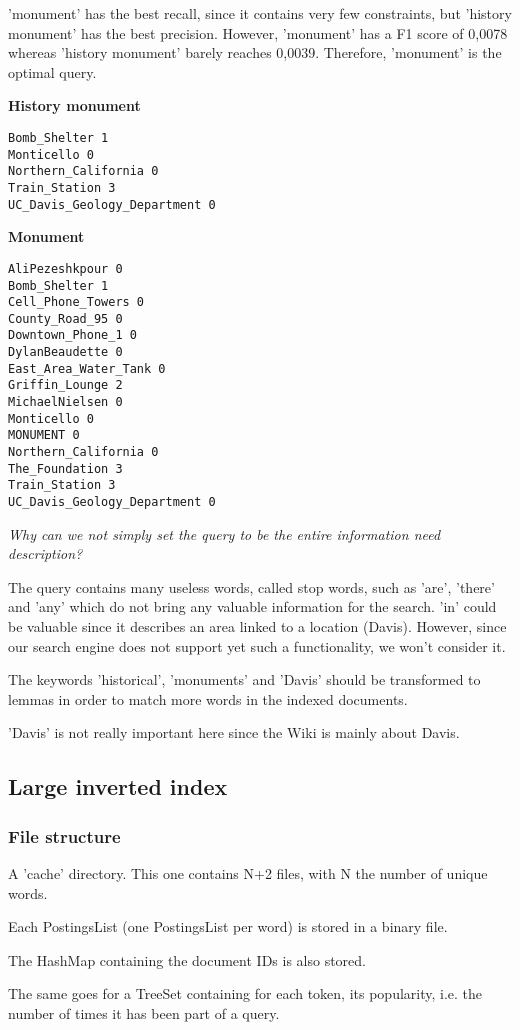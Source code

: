 'monument' has the best recall, since it contains very few constraints, but 'history monument' has the best precision.
However, 'monument' has a F1 score of 0,0078 whereas 'history monument' barely reaches 0,0039. Therefore, 'monument' is the optimal query.

\textbf{History monument}
\begin{verbatim}
Bomb_Shelter 1
Monticello 0
Northern_California 0
Train_Station 3
UC_Davis_Geology_Department 0
\end{verbatim}


\textbf{Monument}
\begin{verbatim}
AliPezeshkpour 0
Bomb_Shelter 1
Cell_Phone_Towers 0
County_Road_95 0
Downtown_Phone_1 0
DylanBeaudette 0
East_Area_Water_Tank 0
Griffin_Lounge 2
MichaelNielsen 0
Monticello 0
MONUMENT 0
Northern_California 0
The_Foundation 3
Train_Station 3
UC_Davis_Geology_Department 0
\end{verbatim}


\textit{Why can we not simply set the query to be the entire information need description?}

The query contains many useless words, called stop words, such as 'are', 'there' and 'any' which do not bring any valuable information for the search.
'in' could be valuable since it describes an area linked to a location (Davis). However, since our search engine does not support yet such a functionality, we won't consider it.

The keywords 'historical', 'monuments' and 'Davis' should be transformed to lemmas in order to match more words in the indexed documents.

'Davis' is not really important here since the Wiki is mainly about Davis.


\subsection{Large inverted index}
\subsubsection{File structure}
A 'cache' directory. This one contains N+2 files, with N the number of unique words.

Each PostingsList (one PostingsList per word) is stored in a binary file.

The HashMap containing the document IDs is also stored.

The same goes for a TreeSet containing for each token, its popularity, i.e. the number of times it has been part of a query.

